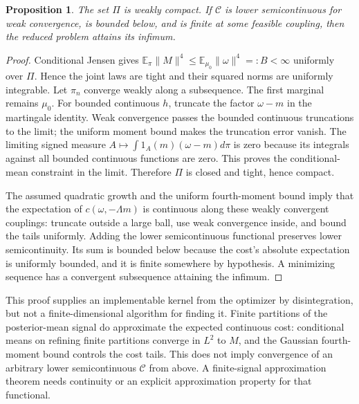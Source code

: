 \documentclass[11pt]{article}
\newtheorem{proposition}{Proposition}
\newcommand{\E}{\mathbb E}
\begin{document}
\begin{proposition}
The set $\Pi$ is weakly compact. If $\mathcal C$ is lower semicontinuous for weak convergence, is bounded below, and is finite at some feasible coupling, then the reduced problem attains its infimum.
\end{proposition}
\begin{proof}
Conditional Jensen gives $\E_\pi\|M\|^4\leq\E_{\mu_0}\|\omega\|^4=:B<\infty$ uniformly over $\Pi$. Hence the joint laws are tight and their squared norms are uniformly integrable. Let $\pi_n$ converge weakly along a subsequence. The first marginal remains $\mu_0$. For bounded continuous $h$, truncate the factor $\omega-m$ in the martingale identity. Weak convergence passes the bounded continuous truncations to the limit; the uniform moment bound makes the truncation error vanish. The limiting signed measure $A\mapsto\int 1_A(m)(\omega-m)d\pi$ is zero because its integrals against all bounded continuous functions are zero. This proves the conditional-mean constraint in the limit. Therefore $\Pi$ is closed and tight, hence compact.

The assumed quadratic growth and the uniform fourth-moment bound imply that the expectation of $c(\omega,-\Lambda m)$ is continuous along these weakly convergent couplings: truncate outside a large ball, use weak convergence inside, and bound the tails uniformly. Adding the lower semicontinuous functional preserves lower semicontinuity. Its sum is bounded below because the cost's absolute expectation is uniformly bounded, and it is finite somewhere by hypothesis. A minimizing sequence has a convergent subsequence attaining the infimum.
\end{proof}

This proof supplies an implementable kernel from the optimizer by disintegration, but not a finite-dimensional algorithm for finding it. Finite partitions of the posterior-mean signal do approximate the expected continuous cost: conditional means on refining finite partitions converge in $L^2$ to $M$, and the Gaussian fourth-moment bound controls the cost tails. This does not imply convergence of an arbitrary lower semicontinuous $\mathcal C$ from above. A finite-signal approximation theorem needs continuity or an explicit approximation property for that functional.
\end{document}
